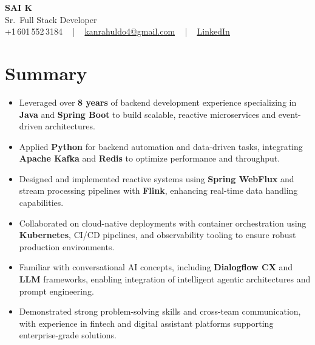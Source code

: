 \documentclass[letterpaper,11pt]{article}
\newcommand{\resumeItem}[1]{
  \item\footnotesize{
    {#1 \vspace{-2pt}}
  }
}
\newcommand{\resumeItemListStart}{\begin{itemize}[leftmargin=*]}
\newcommand{\resumeItemListEnd}{\end{itemize}\vspace{-5pt}}
\begin{document}
\begin{center}
    {\fontsize{14pt}{12pt}\selectfont \textbf{\MakeUppercase{Sai K}}}\\ \vspace{2pt}
    \fontsize{10pt}{12pt}\selectfont Sr.\ Full Stack Developer\\ \vspace{2pt}
    \fontsize{10pt}{12pt}\selectfont +1\,601\,552\,3184 ~ | ~
    \href{mailto:kanrahuldo4@gmail.com}{kanrahuldo4@gmail.com} ~ | ~
    \href{https://www.linkedin.com/in/srrrk/}{\color{blue}\underline{LinkedIn}}
    \vspace{-10pt}
\end{center}

\section{Summary}
\fontsize{9pt}{10pt}\selectfont
\resumeItemListStart
  \resumeItem{Leveraged over \textbf{8 years} of backend development experience specializing in \textbf{Java} and \textbf{Spring Boot} to build scalable, reactive microservices and event-driven architectures.}
  \resumeItem{Applied \textbf{Python} for backend automation and data-driven tasks, integrating \textbf{Apache Kafka} and \textbf{Redis} to optimize performance and throughput.}
  \resumeItem{Designed and implemented reactive systems using \textbf{Spring WebFlux} and stream processing pipelines with \textbf{Flink}, enhancing real-time data handling capabilities.}
  \resumeItem{Collaborated on cloud-native deployments with container orchestration using \textbf{Kubernetes}, CI/CD pipelines, and observability tooling to ensure robust production environments.}
  \resumeItem{Familiar with conversational AI concepts, including \textbf{Dialogflow CX} and \textbf{LLM} frameworks, enabling integration of intelligent agentic architectures and prompt engineering.}
  \resumeItem{Demonstrated strong problem-solving skills and cross-team communication, with experience in fintech and digital assistant platforms supporting enterprise-grade solutions.}
\resumeItemListEnd
\vspace{-6pt}

\end{document}
